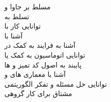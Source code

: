\nazanin
مسلط بر جاوا و 
\\
تسلط به 
\\
توانایی کار با 
\\
آشنا با 
\\
آشنا به فرایند 
به کمک 
 در 
\\
 توانایی اتوماسیون به کمک 
  یا 
\\
  پایبند به اصول 
 کد تمیز و 
  ها
\\
  آشنا با معماری های 
   و 
\\
توانایی حل مسئله و تفکر الگوریتمی
\\
مشتاق برای کار گروهی